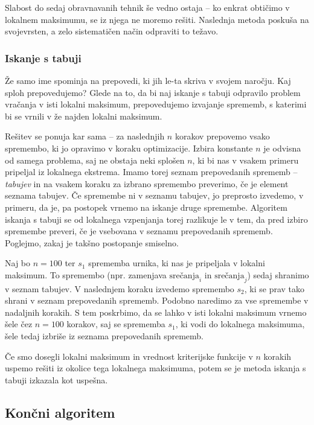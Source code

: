 \documentclass[a4paper,10pt]{article}
\begin{document}
Slabost do sedaj obravnavanih tehnik še vedno ostaja -- ko enkrat obtičimo v lokalnem
maksimumu, se iz njega ne moremo rešiti. Naslednja metoda poskuša na svojevrsten, a zelo
sistematičen način odpraviti to težavo.

\subsubsection{Iskanje s tabuji} %

Že samo ime spominja na prepovedi, ki jih le-ta skriva v svojem naročju. Kaj sploh prepovedujemo?
Glede na to, da bi naj iskanje s tabuji odpravilo problem vračanja v isti lokalni maksimum,
prepovedujemo izvajanje sprememb, s katerimi bi se vrnili v že najden lokalni maksimum.

Rešitev se ponuja kar sama -- za naslednjih $n$ korakov prepovemo vsako spremembo, ki jo
opravimo v koraku optimizacije. Izbira konstante $n$ je odvisna od samega problema, saj
ne obstaja neki splošen $n$, ki bi nas v vsakem primeru pripeljal iz lokalnega ekstrema.
Imamo torej seznam prepovedanih sprememb -- \emph{tabujev} in na vsakem koraku za izbrano
spremembo preverimo, če je element seznama tabujev. Če spremembe ni v seznamu tabujev, jo
preprosto izvedemo, v primeru, da je, pa postopek vrnemo na iskanje druge spremembe.
Algoritem iskanja s tabuji se od lokalnega vzpenjanja torej razlikuje le v tem, da pred
izbiro spremembe preveri, če je vsebovana v seznamu prepovedanih sprememb. Poglejmo, zakaj
je takšno postopanje smiselno.

Naj bo $n=100$ ter $s_1$ sprememba urnika, ki nas je pripeljala v lokalni maksimum. To
spremembo (npr. zamenjava $\text{srečanja}_{i}$ in $\text{srečanja}_{j}$) sedaj shranimo v
seznam tabujev. V naslednjem koraku izvedemo spremembo $s_2$, ki se prav tako shrani v
seznam prepovedanih sprememb. Podobno naredimo za vse spremembe v nadaljnih korakih. S
tem poskrbimo, da se lahko v isti lokalni maksimum vrnemo šele čez $n=100$ korakov, saj
se sprememba  $s_1$, ki vodi do lokalnega maksimuma, šele tedaj izbriše iz seznama
prepovedanih sprememb.

Če smo dosegli lokalni maksimum in vrednost kriterijske funkcije v $n$ korakih uspemo
rešiti iz okolice tega lokalnega maksimuma, potem se je metoda iskanja s tabuji izkazala
kot uspešna.

\subsection{Končni algoritem} %
\end{document}
